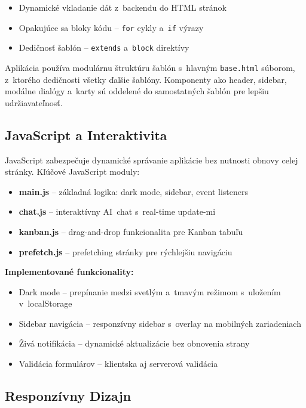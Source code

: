\begin{itemize}
  \item Dynamické vkladanie dát z~backendu do HTML stránok
  \item Opakujúce sa bloky kódu -- \texttt{for} cykly a~\texttt{if} výrazy
  \item Dedičnosť šablón -- \texttt{extends} a~\texttt{block} direktívy
\end{itemize}

        Aplikácia používa modulárnu štruktúru šablón s~hlavným \texttt{base.html} súborom,
z~ktorého dedičnosti všetky ďalšie šablóny. Komponenty ako header, sidebar, modálne
dialógy a~karty sú oddelené do samostatných šablón pre lepšiu udržiavateľnosť.

\subsection{JavaScript a Interaktivita}

        JavaScript zabezpečuje dynamické správanie aplikácie bez nutnosti obnovy celej
stránky. Kľúčové JavaScript moduly:

\begin{itemize}
  \item \textbf{main.js} -- základná logika: dark mode, sidebar, event listeners
  \item \textbf{chat.js} -- interaktívny AI~chat s~real-time update-mi
  \item \textbf{kanban.js} -- drag-and-drop funkcionalita pre Kanban tabuľu
  \item \textbf{prefetch.js} -- prefetching stránky pre rýchlejšiu navigáciu
\end{itemize}

        \textbf{Implementované funkcionality:}

\begin{itemize}
  \item Dark mode -- prepínanie medzi svetlým a~tmavým režimom s~uložením v~localStorage
  \item Sidebar navigácia -- responzívny sidebar s~overlay na mobilných zariadeniach
  \item Živá notifikácia -- dynamické aktualizácie bez obnovenia strany
  \item Validácia formulárov -- klientska aj serverová validácia
\end{itemize}

\subsection{Responzívny Dizajn}

